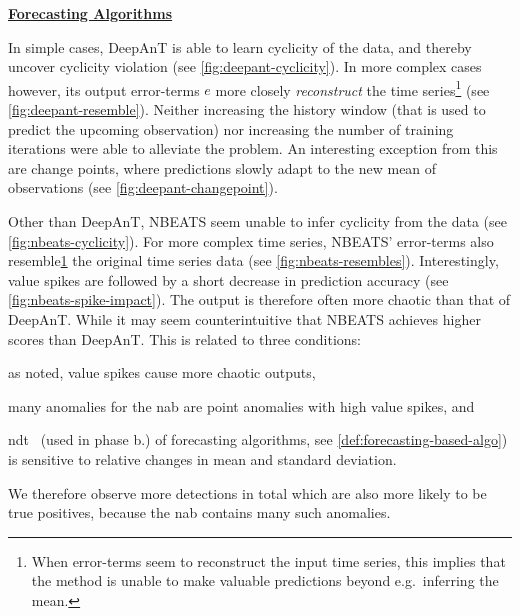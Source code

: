 \bigskip
{\large\uline{\textbf{Forecasting Algorithms}}}\\
\begin{description}[style=unboxed,leftmargin=0cm]
    \item[DeepAnT] In simple cases, DeepAnT is able to learn cyclicity of the data,
    and thereby uncover cyclicity violation (see \cref{fig:deepant-cyclicity}).
    In more complex cases however, its output error-terms \(e\) more closely
    \textit{reconstruct} the time series\footnote{\label{foot:err-reconstructs}When
    error-terms seem to reconstruct the input time series, this implies that the
    method is unable to make valuable predictions beyond e.g.\ inferring the mean.}
    (see \cref{fig:deepant-resemble}). Neither increasing the history window
    (that is used to predict the upcoming observation) nor increasing the number
    of training iterations were able to alleviate the problem. An interesting
    exception from this are change points, where predictions slowly adapt to the
    new mean of observations (see \cref{fig:deepant-changepoint}).
    \item[NBEATS] Other than DeepAnT, NBEATS seem unable to infer cyclicity from
    the data (see \cref{fig:nbeats-cyclicity}). For more complex time series,
    NBEATS' error-terms also resemble\cref{foot:err-reconstructs} the original
    time series data (see \cref{fig:nbeats-resembles}). Interestingly, value
    spikes are followed by a short decrease in prediction accuracy
    (see \cref{fig:nbeats-spike-impact}). The output is therefore often more
    chaotic than that of DeepAnT. While it may seem counterintuitive that NBEATS
    achieves higher scores than DeepAnT. This is related to three conditions:
    \begin{enumerate*}[a.)]
        \item as noted, value spikes cause more chaotic outputs,
        \item many anomalies for the \gls{nab} are point anomalies with high value spikes, and
        \item \gls{ndt}~\cite[cf.][]{Hundman.2018} (used in phase b.) of
        forecasting algorithms, see \cref{def:forecasting-based-algo}) is sensitive
        to relative changes in mean and standard deviation.
    \end{enumerate*}
    
    We therefore observe more detections in total which are also more likely to
    be true positives, because the \gls{nab} contains many such anomalies.


\end{description}
